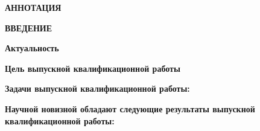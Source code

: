 \newpage
\begin{center}
  \textbf{\large АННОТАЦИЯ}
\end{center}



\onehalfspacing
\setcounter{page}{2}

\newpage
\renewcommand{\contentsname}{\centerline{\large СОДЕРЖАНИЕ}}
\tableofcontents

\newpage
\begin{center}
  \textbf{\large ВВЕДЕНИЕ}
\end{center}


\textbf{Актуальность}

\textbf{Цель выпускной квалификационной работы} 

\textbf{Задачи выпускной квалификационной работы:}

\textbf{Научной новизной обладают следующие результаты выпускной
  квалификационной работы:}

